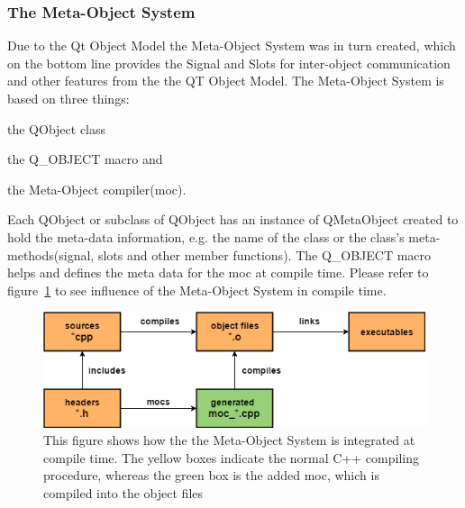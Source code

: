 \subsubsection{The Meta-Object System}
Due to the Qt Object Model the Meta-Object System was in turn created, which on the bottom line provides the Signal and Slots for inter-object communication and other features from the the QT Object Model. The Meta-Object System is based on three things:
\begin{enumerate*}[label={\alph*)},font={\color{red!50!black}\bfseries}]
\item the QObject class
\item the Q\_OBJECT macro and
\item the Meta-Object compiler(moc).
\end{enumerate*}
Each QObject or subclass of QObject has an instance of QMetaObject created to hold the meta-data information, e.g. the name of the class or the class's meta-methods(signal, slots and other member functions). The Q\_OBJECT macro helps and defines the meta data for the moc at compile time. Please refer to figure~\ref{fig:QtC++BuildProcess} to see influence of the Meta-Object System in compile time.

\begin{figure}[h]
	\centering
	\includegraphics[scale=0.55]{Figures/QtC++BuildProcess.png}
	\caption{This figure shows how the the Meta-Object System is integrated at compile time. The yellow boxes indicate the normal C++ compiling procedure, whereas the green box is the added moc, which is compiled into the object files}
	\label{fig:QtC++BuildProcess}
\end{figure}

